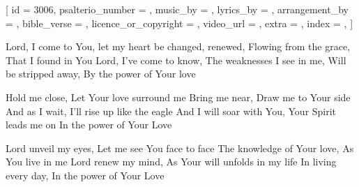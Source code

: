 
[
    id = {3006},
    psalterio_number = {},
    music_by = {},
    lyrics_by = {},
    arrangement_by = {},
    bible_verse = {},
    licence_or_copyright = {},
    video_url = {},
    extra = {},
    index = {},
]


\beginverse
	
Lord, I come to You, let my heart be changed, renewed,
Flowing from the grace, 
That I found in You
Lord, I've come to know,
 The weaknesses I see in me,
Will be stripped away, 
By the power of Your love

\endverse


\beginchorus

Hold me close, 
Let Your love surround me
Bring me near, Draw me to Your side
And as I wait, I'll rise up like the eagle
And I will soar with You, 
Your Spirit leads me on
In the power of Your Love

\endchorus


\beginverse

\chordsoff
Lord unveil my eyes,
 Let me see You face to face
The knowledge of Your love, 
As You live in me
Lord renew my mind,
 As Your will unfolds in my life
In living every day, 
In the power of Your Love 
\chordson

\endverse





\endsong
